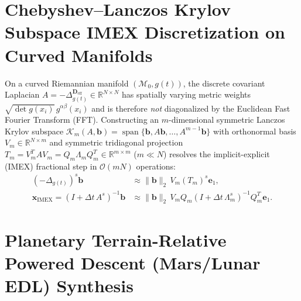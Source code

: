 \documentclass[11pt,a4paper,reqno]{article}
\theoremstyle{plain}
\theoremstyle{definition}
\theoremstyle{remark}
\numberwithin{equation}{section}
\begin{document}
\section{Chebyshev--Lanczos Krylov Subspace IMEX Discretization on Curved Manifolds}
\label{sec:krylov_imex}

On a curved Riemannian manifold $(\mathcal{M}_0, g(t))$, the discrete covariant Laplacian $A = -\Delta_{g(t)}^{\mathbf{D}_{\mathrm{eff}}} \in \mathbb{R}^{N \times N}$ has spatially varying metric weights $\sqrt{\det g(x_i)}\,g^{\alpha\beta}(x_i)$ and is therefore \emph{not} diagonalized by the Euclidean Fast Fourier Transform (FFT). Constructing an $m$-dimensional symmetric Lanczos Krylov subspace $\mathcal{K}_m(A, \mathbf{b}) = \operatorname{span}\{\mathbf{b}, A\mathbf{b}, \dots, A^{m-1}\mathbf{b}\}$ \cite{saad1992analysis, higham2008functions} with orthonormal basis $V_m \in \mathbb{R}^{N \times m}$ and symmetric tridiagonal projection $T_m = V_m^T A V_m = Q_m \Lambda_m Q_m^T \in \mathbb{R}^{m \times m}$ ($m \ll N$) resolves the implicit-explicit (IMEX) fractional step in $\mathcal{O}(m N)$ operations:
\begin{align}\label{eq:krylov_imex}
  (-\Delta_{g(t)})^s \mathbf{b} &\approx \|\mathbf{b}\|_2\, V_m (T_m)^s \mathbf{e}_1, \nonumber \\
  \mathbf{x}_{\mathrm{IMEX}} = \left(I + \Delta t\,A^s\right)^{-1}\mathbf{b} &\approx \|\mathbf{b}\|_2\, V_m Q_m \left(I + \Delta t\,\Lambda_m^s\right)^{-1} Q_m^T \mathbf{e}_1.
\end{align}

\section{Planetary Terrain-Relative Powered Descent (Mars/Lunar EDL) Synthesis}
\label{sec:mars_edl}
\end{document}

